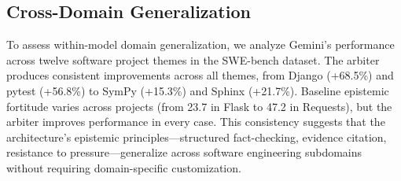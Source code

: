 \subsection{Cross-Domain Generalization}
\label{subsec:cross-domain}

To assess within-model domain generalization, we analyze Gemini's performance across twelve software project themes in the SWE-bench dataset. The arbiter produces consistent improvements across all themes, from Django (+68.5\%) and pytest (+56.8\%) to SymPy (+15.3\%) and Sphinx (+21.7\%). Baseline epistemic fortitude varies across projects (from 23.7 in Flask to 47.2 in Requests), but the arbiter improves performance in every case. This consistency suggests that the architecture's epistemic principles---structured fact-checking, evidence citation, resistance to pressure---generalize across software engineering subdomains without requiring domain-specific customization.
